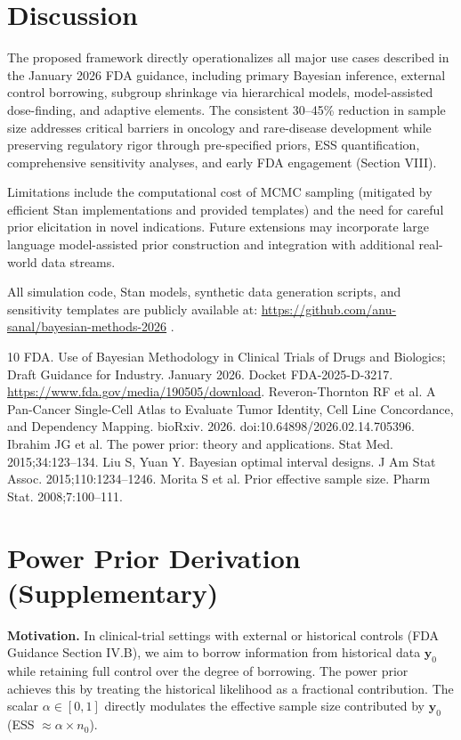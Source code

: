 \documentclass[11pt,a4paper,twoside]{article}
\begin{document}
\section{Discussion}
The proposed framework directly operationalizes all major use cases described in the January 2026 FDA guidance, including primary Bayesian inference, external control borrowing, subgroup shrinkage via hierarchical models, model-assisted dose-finding, and adaptive elements. The consistent 30–45\% reduction in sample size addresses critical barriers in oncology and rare-disease development while preserving regulatory rigor through pre-specified priors, ESS quantification, comprehensive sensitivity analyses, and early FDA engagement (Section VIII).

Limitations include the computational cost of MCMC sampling (mitigated by efficient Stan implementations and provided templates) and the need for careful prior elicitation in novel indications. Future extensions may incorporate large language model-assisted prior construction and integration with additional real-world data streams.

All simulation code, Stan models, synthetic data generation scripts, and sensitivity templates are publicly available at:  
\url{https://github.com/anu-sanal/bayesian-methods-2026}  
.

\begin{thebibliography}{10}
 FDA. Use of Bayesian Methodology in Clinical Trials of Drugs and Biologics; Draft Guidance for Industry. January 2026. Docket FDA-2025-D-3217. \url{https://www.fda.gov/media/190505/download}.
 Reveron-Thornton RF et al. A Pan-Cancer Single-Cell Atlas to Evaluate Tumor Identity, Cell Line Concordance, and Dependency Mapping. bioRxiv. 2026. doi:10.64898/2026.02.14.705396.
 Ibrahim JG et al. The power prior: theory and applications. Stat Med. 2015;34:123--134.
 Liu S, Yuan Y. Bayesian optimal interval designs. J Am Stat Assoc. 2015;110:1234--1246.
 Morita S et al. Prior effective sample size. Pharm Stat. 2008;7:100--111.
\end{thebibliography}

\appendix
\section{Power Prior Derivation (Supplementary)}

\textbf{Motivation.} In clinical-trial settings with external or historical controls (FDA Guidance Section IV.B), we aim to borrow information from historical data $\mathbf{y}_0$ while retaining full control over the degree of borrowing. The power prior achieves this by treating the historical likelihood as a fractional contribution. The scalar $\alpha \in [0,1]$ directly modulates the effective sample size contributed by $\mathbf{y}_0$ (ESS $\approx \alpha \times n_0$).
\end{document}

